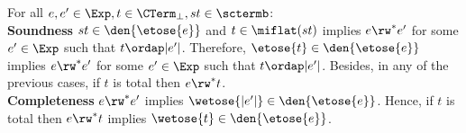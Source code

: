 \begin{theorem} 
For all $e, e' \in \Exp, t \in \CTerm_\perp, st \in \sctermb$: \\
\textbf{Soundness }$st \in \den{\etose{e}}$ and $t \in \miflat(st)$ implies $e \rw^* e'$ for some $e' \in \Exp$ such that $t \ordap |e'|$. Therefore, $\etose{t} \in \den{\etose{e}}$ implies 
$e \rw^* e'$ for some $e' \in \Exp$ such that $t \ordap |e'|$. Besides, in any of the previous cases, if $t$ is total then $e \rw^* t$.\\
\textbf{Completeness} $e \rw^* e'$ implies $\wetose{|e'|} \in \den{\etose{e}}$. Hence, if $t$ is total then $e \rw^* t$ implies $\wetose{t} \in \den{\etose{e}}$. 
\end{theorem}
